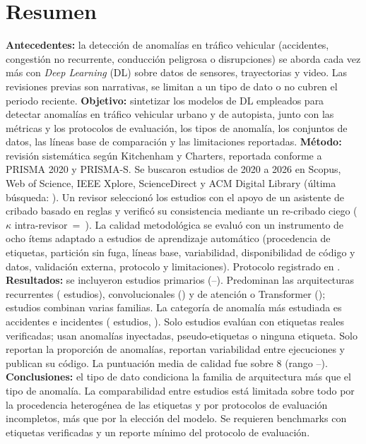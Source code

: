 \documentclass[12pt, a4paper]{article}
\begin{document}
\section*{Resumen}
\textbf{Antecedentes:} la detecci\'{o}n de anomal\'{i}as en tr\'{a}fico vehicular (accidentes, congesti\'{o}n no recurrente, conducci\'{o}n peligrosa o disrupciones) se aborda cada vez m\'{a}s con \textit{Deep Learning} (DL) sobre datos de sensores, trayectorias y video. Las revisiones previas son narrativas, se limitan a un tipo de dato o no cubren el periodo reciente.
\textbf{Objetivo:} sintetizar los modelos de DL empleados para detectar anomal\'{i}as en tr\'{a}fico vehicular urbano y de autopista, junto con las m\'{e}tricas y los protocolos de evaluaci\'{o}n, los tipos de anomal\'{i}a, los conjuntos de datos, las l\'{i}neas base de comparaci\'{o}n y las limitaciones reportadas.
\textbf{M\'{e}todo:} revisi\'{o}n sistem\'{a}tica seg\'{u}n Kitchenham y Charters, reportada conforme a PRISMA 2020 y PRISMA-S. Se buscaron estudios de 2020 a 2026 en Scopus, Web of Science, IEEE Xplore, ScienceDirect y ACM Digital Library (\'{u}ltima b\'{u}squeda: \FechaBusqueda). Un revisor seleccion\'{o} los estudios con el apoyo de un asistente de cribado basado en reglas y verific\'{o} su consistencia mediante un re-cribado ciego ($\kappa$ intra-revisor~=~\KappaRecribadoTA). La calidad metodol\'{o}gica se evalu\'{o} con un instrumento de ocho \'{i}tems adaptado a estudios de aprendizaje autom\'{a}tico (procedencia de etiquetas, partici\'{o}n sin fuga, l\'{i}neas base, variabilidad, disponibilidad de c\'{o}digo y datos, validaci\'{o}n externa, protocolo y limitaciones). Protocolo registrado en \RegistroOSF.
\textbf{Resultados:} se incluyeron \Nestudios{} estudios primarios (\AnioMin--\AnioMax). Predominan las arquitecturas recurrentes (\NfamRec{} estudios), convolucionales (\NfamConv{}) y de atenci\'{o}n o Transformer (\NfamTransf{}); \Nhibrido{} estudios combinan varias familias. La categor\'{i}a de anomal\'{i}a m\'{a}s estudiada es accidentes e incidentes (\NcatA{} estudios, \PcatA). Solo \NetiqVerificadas{} estudios eval\'{u}an con etiquetas reales verificadas; \NetiqNoReales{} usan anomal\'{i}as inyectadas, pseudo-etiquetas o ninguna etiqueta. Solo \Ntasa{} reportan la proporci\'{o}n de anomal\'{i}as, \Nvariabilidad{} reportan variabilidad entre ejecuciones y \NcodigoURL{} publican su c\'{o}digo. La puntuaci\'{o}n media de calidad fue \QAmedia{} sobre 8 (rango \QAmin--\QAmax).
\textbf{Conclusiones:} el tipo de dato condiciona la familia de arquitectura m\'{a}s que el tipo de anomal\'{i}a. La comparabilidad entre estudios est\'{a} limitada sobre todo por la procedencia heterog\'{e}nea de las etiquetas y por protocolos de evaluaci\'{o}n incompletos, m\'{a}s que por la elecci\'{o}n del modelo. Se requieren benchmarks con etiquetas verificadas y un reporte m\'{i}nimo del protocolo de evaluaci\'{o}n.
\end{document}
